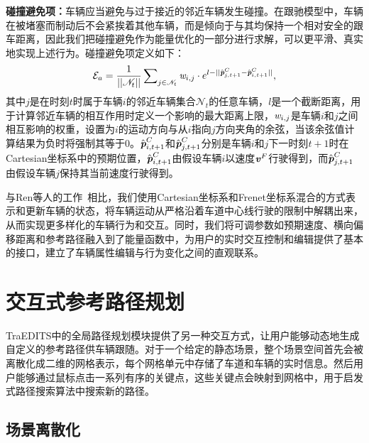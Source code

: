 \textbf{碰撞避免项：}车辆应当避免与过于接近的邻近车辆发生碰撞。在跟驰模型中，车辆在被堵塞而制动后不会紧挨着其他车辆，而是倾向于与其均保持一个相对安全的跟车距离，因此我们把碰撞避免作为能量优化的一部分进行求解，可以更平滑、真实地实现上述行为。碰撞避免项定义如下：
\begin{equation}
\setlength\abovedisplayskip{6pt}
\setlength\belowdisplayskip{6pt}
    \mathcal{E}_{a} = \frac{1}{||\mathscr{N}_{t}||} \sum\nolimits_{j\in\mathscr{N}_{t}} \emph{w}_{i,j} \cdot e^{ l - || \Hat{ \emph{\textbf{p}}}^{C}_{j,t+1} - \Hat{\emph{\textbf{p}}}^{C}_{i,t+1} || },
\label{eq:traedits_collisionavoid}
\end{equation}
其中$j$是在时刻$t$时属于车辆$i$的邻近车辆集合$\mathscr{N}_{t}$的任意车辆，$l$是一个截断距离，用于计算邻近车辆的相互作用时定义一个影响的最大距离上限，$\emph{w}_{i,j}$是车辆$i$和$j$之间相互影响的权重，设置为$i$的运动方向与从$i$指向$j$方向夹角的余弦，当该余弦值计算结果为负时将强制其等于0。$\Hat{ \emph{\textbf{p}}}^{C}_{i,t+1}$和$\Hat{ \emph{\textbf{p}}}^{C}_{j,t+1}$分别是车辆$i$和$j$下一时刻$t+1$时在Cartesian坐标系中的预期位置，$\Hat{ \emph{\textbf{p}}}^{C}_{i,t+1}$由假设车辆$i$以速度$\textbf{\emph{v}}^{F}$行驶得到，而$\Hat{ \emph{\textbf{p}}}^{C}_{j,t+1}$由假设车辆$j$保持其当前速度行驶得到。

与Ren等人的工作~\cite{ren2019heter}相比，我们使用Cartesian坐标系和Frenet坐标系混合的方式表示和更新车辆的状态，将车辆运动从严格沿着车道中心线行驶的限制中解耦出来，从而实现更多样化的车辆行为和交互。同时，我们将可调参数如预期速度、横向偏移距离和参考路径融入到了能量函数中，为用户的实时交互控制和编辑提供了基本的接口，建立了车辆属性编辑与行为变化之间的直观联系。





\section{交互式参考路径规划}

TraEDITS中的全局路径规划模块提供了另一种交互方式，让用户能够动态地生成自定义的参考路径供车辆跟随。对于一个给定的静态场景，整个场景空间首先会被离散化成二维的网格表示，每个网格单元中存储了车道和车辆的实时信息。然后用户能够通过鼠标点击一系列有序的关键点，这些关键点会映射到网格中，用于启发式路径搜索算法中搜索新的路径。

\subsection{场景离散化}
\label{section:traedits_discretize}

